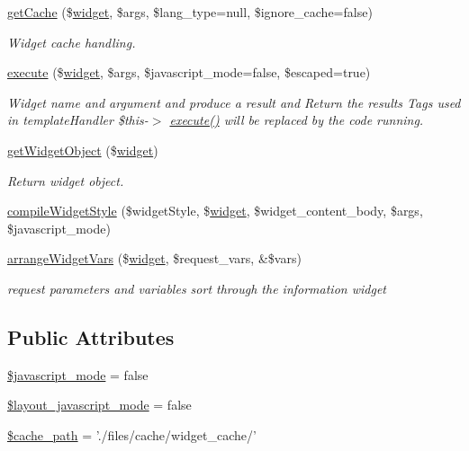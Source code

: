 \begin{DoxyCompactItemize}
\hyperlink{classwidgetController_ad866136705c196f9b7b231f58be317eb}{get\-Cache} (\$\hyperlink{classwidget}{widget}, \$args, \$lang\-\_\-type=null, \$ignore\-\_\-cache=false)
\begin{DoxyCompactList}\small\item\em Widget cache handling. \end{DoxyCompactList}\item 
\hyperlink{classwidgetController_a8344d21b83ae400500e70f371817a8d9}{execute} (\$\hyperlink{classwidget}{widget}, \$args, \$javascript\-\_\-mode=false, \$escaped=true)
\begin{DoxyCompactList}\small\item\em Widget name and argument and produce a result and Return the results Tags used in template\-Handler \$this-\/$>$ \hyperlink{classwidgetController_a8344d21b83ae400500e70f371817a8d9}{execute()} will be replaced by the code running. \end{DoxyCompactList}\item 
\hyperlink{classwidgetController_a15059522aa8548d03668025d20d6d152}{get\-Widget\-Object} (\$\hyperlink{classwidget}{widget})
\begin{DoxyCompactList}\small\item\em Return widget object. \end{DoxyCompactList}\item 
\hyperlink{classwidgetController_ad399f4e9088de6b63e479bfd68c1f2a0}{compile\-Widget\-Style} (\$widget\-Style, \$\hyperlink{classwidget}{widget}, \$widget\-\_\-content\-\_\-body, \$args, \$javascript\-\_\-mode)
\item 
\hyperlink{classwidgetController_a7f852fc1f0b521ff574f85ee067173ce}{arrange\-Widget\-Vars} (\$\hyperlink{classwidget}{widget}, \$request\-\_\-vars, \&\$vars)
\begin{DoxyCompactList}\small\item\em request parameters and variables sort through the information widget \end{DoxyCompactList}\end{DoxyCompactItemize}
\subsection*{Public Attributes}
\begin{DoxyCompactItemize}
\item 
\hyperlink{classwidgetController_a9879a9de581b205ffa63cc0297dcefab}{\$javascript\-\_\-mode} = false
\item 
\hyperlink{classwidgetController_ab123ebb549e616c6e67bf79e73f56ac8}{\$layout\-\_\-javascript\-\_\-mode} = false
\item 
\hyperlink{classwidgetController_a279375b189444d13250d8111910655c3}{\$cache\-\_\-path} = './files/cache/widget\-\_\-cache/'
\end{DoxyCompactItemize}


